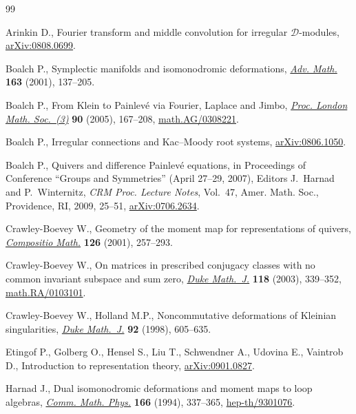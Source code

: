 \documentclass[pdftex]{sigma}
\numberwithin{equation}{section}
\theoremstyle{definition}
\begin{document}
\begin{thebibliography}{99}

\footnotesize\itemsep=0pt

Arinkin D.,
Fourier transform and middle convolution for irregular $\mathscr{D}$-modules,
\href{http://arxiv.org/abs/0808.0699}{arXiv:0808.0699}.

Boalch P.,
Symplectic manifolds and isomonodromic deformations,
\href{http://dx.doi.org/10.1006/aima.2001.1998}{\emph{Adv. Math.}} \textbf{163} (2001), 137--205.

Boalch P.,
From Klein to Painlev\'e via Fourier, Laplace and Jimbo,
\href{http://dx.doi.org/10.1112/S0024611504015011}{\emph{Proc. London Math. Soc.~(3)}} \textbf{90} (2005), 167--208,
\href{http://arxiv.org/abs/math.AG/0308221}{math.AG/0308221}.

Boalch P.,
Irregular connections and Kac--Moody root systems,
\href{http://arxiv.org/abs/0806.1050}{arXiv:0806.1050}.

Boalch P.,
Quivers and dif\/ference Painlev\'e equations,
in Proceedings of Conference ``Groups and Sym\-met\-ries'' (April 27--29, 2007),
Editors J.~Harnad and P.~Winternitz,
{\it CRM Proc. Lecture Notes}, Vol.~47, Amer. Math. Soc., Providence, RI, 2009, 25--51,
\href{http://arxiv.org/abs/0706.2634}{arXiv:0706.2634}.

Crawley-Boevey W.,
Geometry of the moment map for representations of quivers,
\href{http://dx.doi.org/10.1023/A:1017558904030}{\emph{Compositio Math.}} \textbf{126} (2001), 257--293.

Crawley-Boevey W.,
On matrices in prescribed conjugacy classes with no common
invariant subspace and sum zero,
\href{http://dx.doi.org/10.1215/S0012-7094-03-11825-6}{\emph{Duke Math.~J.}} \textbf{118} (2003), 339--352,
\href{http://arxiv.org/abs/math.RA/0103101}{math.RA/0103101}.

Crawley-Boevey W., Holland M.P.,
Noncommutative deformations of Kleinian singularities,
\href{http://dx.doi.org/10.1215/S0012-7094-98-09218-3}{\emph{Duke Math.~J.}} \textbf{92} (1998), 605--635.

Etingof P., Golberg O., Hensel S., Liu T., Schwendner A., Udovina E., Vaintrob D.,
Introduction to representation theory,
\href{http://arxiv.org/abs/0901.0827}{arXiv:0901.0827}.

Harnad J.,
Dual isomonodromic deformations and moment maps to loop algebras,
\href{http://dx.doi.org/10.1007/BF02112319}{\emph{Comm. Math. Phys.}} \textbf{166} (1994), 337--365,
\href{http://arxiv.org/abs/hep-th/9301076}{hep-th/9301076}.


\end{thebibliography}
\end{document}
